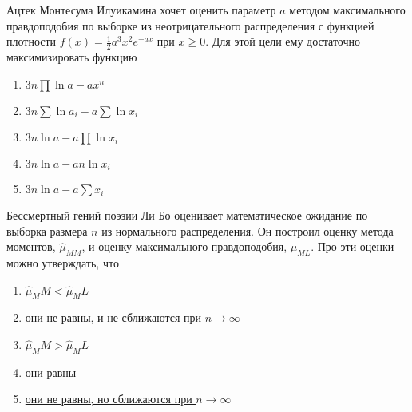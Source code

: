 \documentclass[t]{beamer}
\begin{document}
 \begin{frame} \label{21} 
\begin{block}{21} 

Ацтек Монтесума Илуикамина хочет оценить параметр $a$ методом максимального правдоподобия по выборке из неотрицательного распределения с функцией плотности $f(x)=\frac{1}{2}a^3x^2e^{-ax}$ при $x\geq 0$. Для этой цели ему достаточно максимизировать функцию
 


 \end{block} 
\begin{enumerate} 
\item[] \hyperlink{21-No}{\beamergotobutton{} $3n\prod \ln a - a x^n$}
\item[] \hyperlink{21-No}{\beamergotobutton{} $3n \sum \ln a_i - a \sum \ln x_i$}
\item[] \hyperlink{21-No}{\beamergotobutton{} $3n\ln a - a \prod \ln x_i$}
\item[] \hyperlink{21-No}{\beamergotobutton{} $3n \ln a - an \ln x_i$}
\item[] \hyperlink{21-Yes}{\beamergotobutton{} $3n \ln a - a \sum x_i$}
\end{enumerate} 
\end{frame} 


 \begin{frame} \label{22} 
\begin{block}{22} 

Бессмертный гений поэзии Ли Бо оценивает математическое ожидание  по выборка размера $n$ из нормального распределения. Он построил оценку метода моментов, $\hat{\mu}_{MM}$, и оценку максимального правдоподобия, $\hat{\mu}_{ML}$. Про эти оценки можно утверждать, что
 


 \end{block} 
\begin{enumerate} 
\item[] \hyperlink{22-No}{\beamergotobutton{} $\hat\mu_MM<\hat\mu_ML$ }
\item[] \hyperlink{22-No}{\beamergotobutton{} они не равны, и не сближаются при $n\to \infty$}
\item[] \hyperlink{22-No}{\beamergotobutton{} $\hat\mu_MM>\hat\mu_ML$}
\item[] \hyperlink{22-Yes}{\beamergotobutton{} они равны}
\item[] \hyperlink{22-No}{\beamergotobutton{} они не равны, но сближаются при $n\to \infty$}
\end{enumerate} 
\end{frame} 
\end{document}
